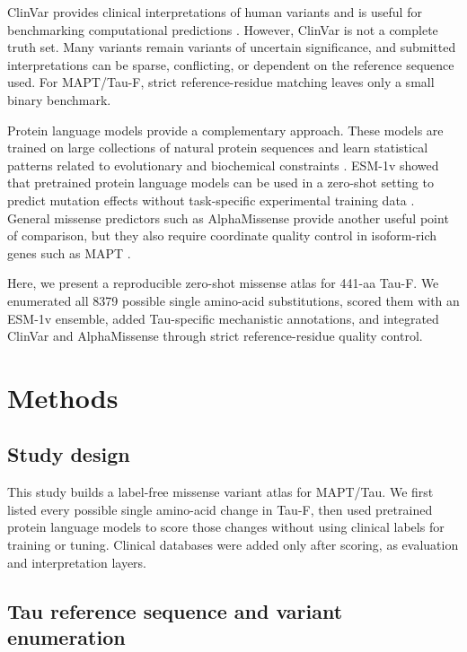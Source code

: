 \documentclass[11pt]{article}
\begin{document}
ClinVar provides clinical interpretations of human variants and is useful for
benchmarking computational predictions \citep{landrum2018clinvar}. However,
ClinVar is not a complete truth set. Many variants remain variants of uncertain
significance, and submitted interpretations can be sparse, conflicting, or
dependent on the reference sequence used. For MAPT/Tau-F, strict
reference-residue matching leaves only a small binary benchmark.

Protein language models provide a complementary approach. These models are
trained on large collections of natural protein sequences and learn statistical
patterns related to evolutionary and biochemical constraints
\citep{rives2021biological}. ESM-1v showed that pretrained protein language
models can be used in a zero-shot setting to predict mutation effects without
task-specific experimental training data \citep{meier2021language}. General
missense predictors such as AlphaMissense provide another useful point of
comparison, but they also require coordinate quality control in isoform-rich
genes such as MAPT \citep{cheng2023alphamissense}.

Here, we present a reproducible zero-shot missense atlas for 441-aa Tau-F. We
enumerated all 8379 possible single amino-acid substitutions, scored them with an
ESM-1v ensemble, added Tau-specific mechanistic annotations, and integrated
ClinVar and AlphaMissense through strict reference-residue quality control.

\section{Methods}

\subsection{Study design}

This study builds a label-free missense variant atlas for MAPT/Tau. We first
listed every possible single amino-acid change in Tau-F, then used pretrained
protein language models to score those changes without using clinical labels for
training or tuning. Clinical databases were added only after scoring, as
evaluation and interpretation layers.

\subsection{Tau reference sequence and variant enumeration}
\end{document}
